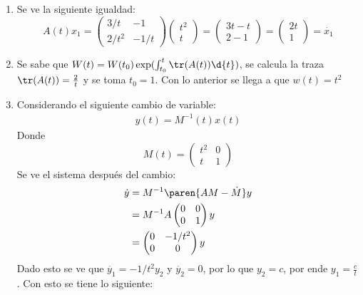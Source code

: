 \documentclass{homework}
\begin{document}
\begin{sol}
    \begin{enumerate}[label=(\alph*)]
        \item Se ve la siguiente igualdad:
        \begin{equation*}
            A(t)x_1=\begin{pmatrix}
                3/t&-1\\2/t^2&-1/t
            \end{pmatrix}\begin{pmatrix}
                t^2\\t
            \end{pmatrix}=\begin{pmatrix}
                3t-t\\2-1
            \end{pmatrix}=\begin{pmatrix}
                2t\\1
            \end{pmatrix}=\dot{x_1}
        \end{equation*}
        \item Se sabe que \(W(t)=W(t_0)\exp(\int_{t_0}^t\tr(A(t))\d{t})\), se calcula la traza \(\tr(A(t))=\frac2t\) y se toma \(t_0=1\). Con lo anterior se llega a que \(w(t)=t^2\)
        \item Considerando el siguiente cambio de variable:
        \begin{align*}
            y(t)=M^{-1}(t)x(t)
        \end{align*}
        Donde 
        \[M(t)=\begin{pmatrix}
            t^2&0\\t&1
        \end{pmatrix}\]
        Se ve el sistema después del cambio:
        \begin{align*}
            \dot{y}&=M^{-1}\paren{AM-\dot{M}}y\\
            &=M^{-1}A\begin{pmatrix}
                0&0\\0&1
            \end{pmatrix}y\\
            &=\begin{pmatrix}
                0&-1/t^2\\0&0
            \end{pmatrix}y
        \end{align*}
        Dado esto se ve que \(\dot{y_1}=-1/t^2y_2\) y \(\dot{y_2}=0\), por lo que \(y_2=c\), por ende \(y_1=\frac{c}t\). Con esto se tiene lo siguiente:

\end{enumerate}
\end{sol}
\end{document}
